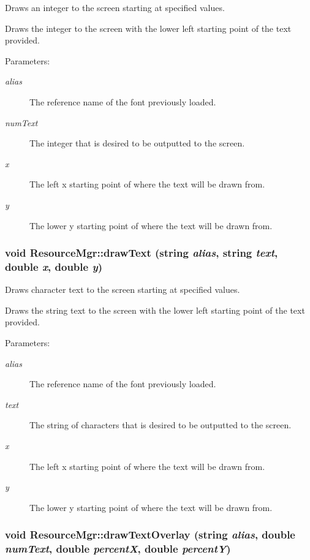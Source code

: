 Draws an integer to the screen starting at specified values. 

Draws the integer to the screen with the lower left starting point of the text provided. \begin{Desc}
\item[Parameters:]
\begin{description}
\item[{\em alias}]The reference name of the font previously loaded. \item[{\em numText}]The integer that is desired to be outputted to the screen. \item[{\em x}]The left x starting point of where the text will be drawn from. \item[{\em y}]The lower y starting point of where the text will be drawn from. \end{description}
\end{Desc}
\hypertarget{class_resource_mgr_4660091df459dc3d0932663aa9156591}{
\subsubsection[{drawText}]{\setlength{\rightskip}{0pt plus 5cm}void ResourceMgr::drawText (string {\em alias}, \/  string {\em text}, \/  double {\em x}, \/  double {\em y})}}
\label{class_resource_mgr_4660091df459dc3d0932663aa9156591}


Draws character text to the screen starting at specified values. 

Draws the string text to the screen with the lower left starting point of the text provided. \begin{Desc}
\item[Parameters:]
\begin{description}
\item[{\em alias}]The reference name of the font previously loaded. \item[{\em text}]The string of characters that is desired to be outputted to the screen. \item[{\em x}]The left x starting point of where the text will be drawn from. \item[{\em y}]The lower y starting point of where the text will be drawn from. \end{description}
\end{Desc}
\hypertarget{class_resource_mgr_2be88222637af2030e608e397cfdd89b}{
\subsubsection[{drawTextOverlay}]{\setlength{\rightskip}{0pt plus 5cm}void ResourceMgr::drawTextOverlay (string {\em alias}, \/  double {\em numText}, \/  double {\em percentX}, \/  double {\em percentY})}}
\label{class_resource_mgr_2be88222637af2030e608e397cfdd89b}


